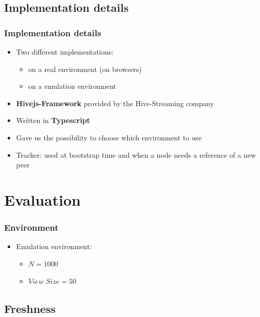 \documentclass{beamer}
\begin{document}
\subsection{Implementation details}

\begin{frame}
\frametitle{Implementation details}
\begin{itemize}
  \item Two different implementations:
  \begin{itemize}
    \item on a real environment (on browsers)
    \item on a emulation environment
  \end{itemize}
  \item \textbf{Hivejs-Framework} provided by the Hive-Streaming company
  \item Written in \textbf{Typescript}
  \item Gave us the possibility to choose which environment to use
  \item Tracker: used at bootstrap time and when a node needs a reference of a new peer
\end{itemize}


\end{frame}
\section{Evaluation}

\begin{frame}\frametitle{Environment}
\begin{itemize}
  \item Emulation environment:
  \begin{itemize}
    \item $N = 1000$
    \item $View$ $Size = 50$
  \end{itemize}

\end{itemize}

\end{frame}

\subsection{Freshness}
\end{document}

